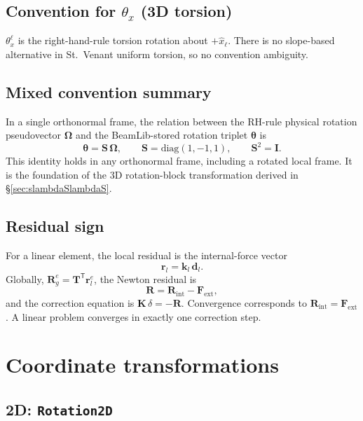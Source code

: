 \documentclass[11pt,a4paper]{book}
\newcommand{\bmath}[1]{\boldsymbol{#1}}
\newcommand{\xhatl}{\hat{x}_\ell}
\newcommand{\Sdiag}{\bmath{S}}
\begin{document}
\subsection{Convention for \texorpdfstring{$\theta_x$}{theta\_x} (3D torsion)}

$\theta_x^\ell$ is the right-hand-rule torsion rotation about $+\xhatl$. There is no slope-based alternative in St.\ Venant uniform torsion, so no convention ambiguity.

\subsection{Mixed convention summary}\label{sec:mixed-convention}

In a single orthonormal frame, the relation between the RH-rule physical rotation pseudovector $\bmath{\Omega}$ and the BeamLib-stored rotation triplet $\bmath{\theta}$ is
\[
\boxed{\;\bmath{\theta} = \Sdiag\,\bmath{\Omega}, \qquad \Sdiag = \mathrm{diag}(1, -1, 1), \qquad \Sdiag^2 = \bmath{I}.\;}
\]
This identity holds in any orthonormal frame, including a rotated local frame. It is the foundation of the 3D rotation-block transformation derived in \S\ref{sec:slambdaSlambdaS}.

\subsection{Residual sign}

For a linear element, the local residual is the internal-force vector
\[
\bmath{r}_l = \bmath{k}_l\,\bmath{d}_l.
\]
Globally, $\bmath{R}_g^e = \bmath{T}^\mathsf{T}\bmath{r}_l^e$, the Newton residual is
\[
\bmath{R} = \bmath{R}_{\mathrm{int}} - \bmath{F}_{\mathrm{ext}},
\]
and the correction equation is $\bmath{K}\,\delta = -\bmath{R}$. Convergence corresponds to $\bmath{R}_{\mathrm{int}} = \bmath{F}_{\mathrm{ext}}$. A linear problem converges in exactly one correction step.

\section{Coordinate transformations}\label{sec:transformations}

\subsection{2D: \texttt{Rotation2D}}
\end{document}

